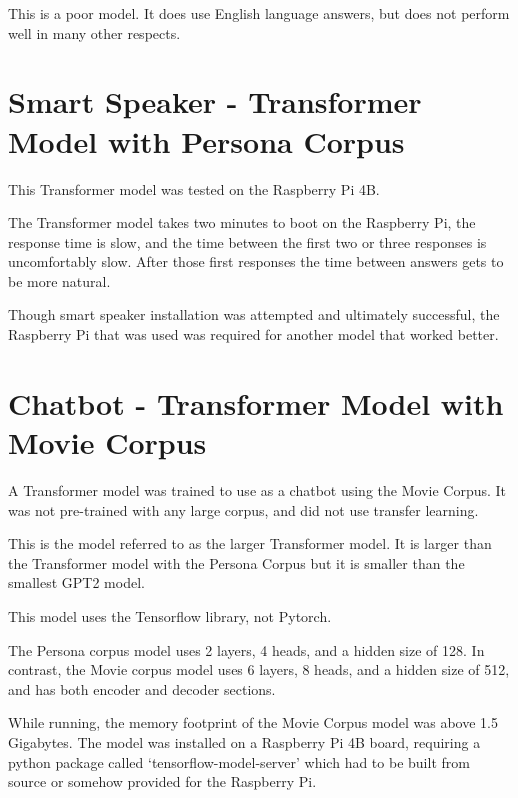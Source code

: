 This is a poor model. It does use English language answers, but does not perform well in many other respects.

\section{Smart Speaker - Transformer Model with Persona Corpus}

This Transformer model was tested on the Raspberry Pi 4B. %

The Transformer model takes two minutes to boot on the Raspberry Pi, the response time is slow, and the time between the first two or three responses is uncomfortably slow. After those first responses the time between answers gets to be more natural.


Though smart speaker installation was attempted and ultimately successful, the Raspberry Pi that was used was required for another model that worked better. %

\section{Chatbot - Transformer Model with Movie Corpus}

\label{transformer-movie-corpus}
A Transformer model was trained to use as a chatbot using the Movie Corpus. It was not pre-trained with any large corpus, and did not use transfer learning. 

This is the model referred to as the larger Transformer model. It is larger than the Transformer model with the Persona Corpus but it is smaller than the smallest GPT2 model.

This model uses the Tensorflow library, not Pytorch. 

The Persona corpus model uses 2 layers, 4 heads, and a hidden size of 128. In contrast, the Movie corpus model uses 6 layers, 8 heads, and a hidden size of 512, and has both encoder and decoder sections.

While running, the memory footprint of the Movie Corpus model was above 1.5 Gigabytes. The model was installed on a Raspberry Pi 4B board, requiring a python package called `tensorflow-model-server' which had to be built from source or somehow provided for the Raspberry Pi. 

